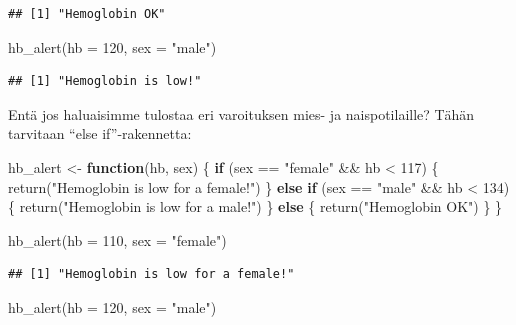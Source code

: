 \documentclass[
]{book}
\newenvironment{Shaded}{\begin{snugshade}}{\end{snugshade}}
\newcommand{\AttributeTok}[1]{\textcolor[rgb]{0.77,0.63,0.00}{#1}}
\newcommand{\ControlFlowTok}[1]{\textcolor[rgb]{0.13,0.29,0.53}{\textbf{#1}}}
\newcommand{\DecValTok}[1]{\textcolor[rgb]{0.00,0.00,0.81}{#1}}
\newcommand{\FunctionTok}[1]{\textcolor[rgb]{0.00,0.00,0.00}{#1}}
\newcommand{\NormalTok}[1]{#1}
\newcommand{\OtherTok}[1]{\textcolor[rgb]{0.56,0.35,0.01}{#1}}
\newcommand{\SpecialCharTok}[1]{\textcolor[rgb]{0.00,0.00,0.00}{#1}}
\newcommand{\StringTok}[1]{\textcolor[rgb]{0.31,0.60,0.02}{#1}}
\begin{document}
\begin{verbatim}
## [1] "Hemoglobin OK"
\end{verbatim}

\begin{Shaded}
\begin{Highlighting}[]
\FunctionTok{hb\_alert}\NormalTok{(}\AttributeTok{hb =} \DecValTok{120}\NormalTok{, }\AttributeTok{sex =} \StringTok{"male"}\NormalTok{)}
\end{Highlighting}
\end{Shaded}

\begin{verbatim}
## [1] "Hemoglobin is low!"
\end{verbatim}

Entä jos haluaisimme tulostaa eri varoituksen mies- ja naispotilaille? Tähän tarvitaan ``else if''-rakennetta:

\begin{Shaded}
\begin{Highlighting}[]
\NormalTok{hb\_alert }\OtherTok{\textless{}{-}} \ControlFlowTok{function}\NormalTok{(hb, sex) \{}
  \ControlFlowTok{if}\NormalTok{ (sex }\SpecialCharTok{==} \StringTok{"female"} \SpecialCharTok{\&\&}\NormalTok{ hb }\SpecialCharTok{\textless{}} \DecValTok{117}\NormalTok{) \{}
    \FunctionTok{return}\NormalTok{(}\StringTok{"Hemoglobin is low for a female!"}\NormalTok{)}
\NormalTok{  \} }\ControlFlowTok{else} \ControlFlowTok{if}\NormalTok{ (sex }\SpecialCharTok{==} \StringTok{"male"} \SpecialCharTok{\&\&}\NormalTok{ hb }\SpecialCharTok{\textless{}} \DecValTok{134}\NormalTok{) \{}
    \FunctionTok{return}\NormalTok{(}\StringTok{"Hemoglobin is low for a male!"}\NormalTok{)}
\NormalTok{  \} }\ControlFlowTok{else}\NormalTok{ \{}
    \FunctionTok{return}\NormalTok{(}\StringTok{"Hemoglobin OK"}\NormalTok{)}
\NormalTok{  \}}
\NormalTok{\}}

\FunctionTok{hb\_alert}\NormalTok{(}\AttributeTok{hb =} \DecValTok{110}\NormalTok{, }\AttributeTok{sex =} \StringTok{"female"}\NormalTok{)}
\end{Highlighting}
\end{Shaded}

\begin{verbatim}
## [1] "Hemoglobin is low for a female!"
\end{verbatim}

\begin{Shaded}
\begin{Highlighting}[]
\FunctionTok{hb\_alert}\NormalTok{(}\AttributeTok{hb =} \DecValTok{120}\NormalTok{, }\AttributeTok{sex =} \StringTok{"male"}\NormalTok{)}
\end{Highlighting}
\end{Shaded}
\end{document}
